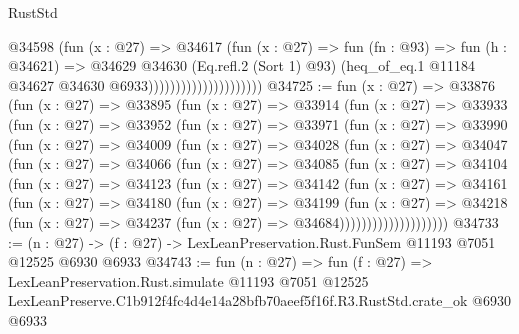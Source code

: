 \begin{lexlean}{RustStd}
\begin{coremodule}
                                      @34598
                                        (fun (x : @27) =>
                                        @34617
                                          (fun (x : @27) =>
                                          fun (fn : @93) =>
                                          fun (h : @34621) =>
                                          @34629
                                            @34630
                                            (Eq.refl.{2} (Sort 1) @93)
                                            (heq_of_eq.{1}
                                              @11184
                                              @34627
                                              @34630
                                              @6933)))))))))))))))))))))
@34725 := fun (x : @27) =>
  @33876
    (fun (x : @27) =>
    @33895
      (fun (x : @27) =>
      @33914
        (fun (x : @27) =>
        @33933
          (fun (x : @27) =>
          @33952
            (fun (x : @27) =>
            @33971
              (fun (x : @27) =>
              @33990
                (fun (x : @27) =>
                @34009
                  (fun (x : @27) =>
                  @34028
                    (fun (x : @27) =>
                    @34047
                      (fun (x : @27) =>
                      @34066
                        (fun (x : @27) =>
                        @34085
                          (fun (x : @27) =>
                          @34104
                            (fun (x : @27) =>
                            @34123
                              (fun (x : @27) =>
                              @34142
                                (fun (x : @27) =>
                                @34161
                                  (fun (x : @27) =>
                                  @34180
                                    (fun (x : @27) =>
                                    @34199
                                      (fun (x : @27) =>
                                      @34218
                                        (fun (x : @27) =>
                                        @34237 (fun (x : @27) => @34684))))))))))))))))))))
@34733 := (n : @27) -> (f : @27) -> LexLeanPreservation.Rust.FunSem @11193 @7051 @12525 @6930 @6933
@34743 := fun (n : @27) =>
  fun (f : @27) =>
  LexLeanPreservation.Rust.simulate
    @11193
    @7051
    @12525
    LexLeanPreserve.C1b912f4fc4d4e14a28bfb70aeef5f16f.R3.RustStd.crate_ok
    @6930
    @6933
\end{coremodule}
\end{lexlean}
